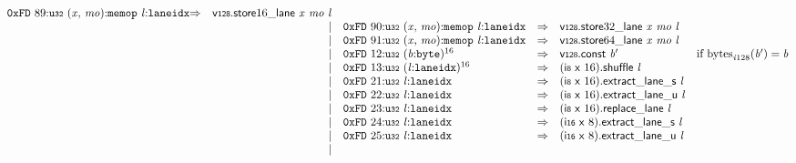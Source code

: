 $$\begin{array}{@{}l@{}rrlll@{}l@{}}
\mathtt{0xFD}~89{:}{\mathtt{u{\scriptstyle32}}}~({\mathit{x}},\, {\mathit{mo}}){:}{\mathtt{memop}}~{\mathit{l}}{:}{\mathtt{laneidx}} &\Rightarrow& {{{\mathsf{v{\scriptstyle128}.store}}{16}}{\mathsf{\_}}}{\mathsf{lane}}~{\mathit{x}}~{\mathit{mo}}~{\mathit{l}} \\ &&|&
\mathtt{0xFD}~90{:}{\mathtt{u{\scriptstyle32}}}~({\mathit{x}},\, {\mathit{mo}}){:}{\mathtt{memop}}~{\mathit{l}}{:}{\mathtt{laneidx}} &\Rightarrow& {{{\mathsf{v{\scriptstyle128}.store}}{32}}{\mathsf{\_}}}{\mathsf{lane}}~{\mathit{x}}~{\mathit{mo}}~{\mathit{l}} \\ &&|&
\mathtt{0xFD}~91{:}{\mathtt{u{\scriptstyle32}}}~({\mathit{x}},\, {\mathit{mo}}){:}{\mathtt{memop}}~{\mathit{l}}{:}{\mathtt{laneidx}} &\Rightarrow& {{{\mathsf{v{\scriptstyle128}.store}}{64}}{\mathsf{\_}}}{\mathsf{lane}}~{\mathit{x}}~{\mathit{mo}}~{\mathit{l}} \\ &&|&
\mathtt{0xFD}~12{:}{\mathtt{u{\scriptstyle32}}}~{({\mathit{b}}{:}{\mathtt{byte}})^{16}} &\Rightarrow& \mathsf{v{\scriptstyle128}}.\mathsf{const}~{\mathit{b}'} &\quad
  \mbox{if}~{{\mathrm{bytes}}}_{{{\mathit{i}}}{128}}({\mathit{b}'}) = {\mathit{b}} \\ &&|&
\mathtt{0xFD}~13{:}{\mathtt{u{\scriptstyle32}}}~{({\mathit{l}}{:}{\mathtt{laneidx}})^{16}} &\Rightarrow& (\mathsf{i{\scriptstyle8}}~\mathsf{x}~16).\mathsf{shuffle}~{\mathit{l}} \\ &&|&
\mathtt{0xFD}~21{:}{\mathtt{u{\scriptstyle32}}}~{\mathit{l}}{:}{\mathtt{laneidx}} &\Rightarrow& {(\mathsf{i{\scriptstyle8}}~\mathsf{x}~16).\mathsf{extract\_lane\_}}{\mathsf{s}}~{\mathit{l}} \\ &&|&
\mathtt{0xFD}~22{:}{\mathtt{u{\scriptstyle32}}}~{\mathit{l}}{:}{\mathtt{laneidx}} &\Rightarrow& {(\mathsf{i{\scriptstyle8}}~\mathsf{x}~16).\mathsf{extract\_lane\_}}{\mathsf{u}}~{\mathit{l}} \\ &&|&
\mathtt{0xFD}~23{:}{\mathtt{u{\scriptstyle32}}}~{\mathit{l}}{:}{\mathtt{laneidx}} &\Rightarrow& (\mathsf{i{\scriptstyle8}}~\mathsf{x}~16).\mathsf{replace\_lane}~{\mathit{l}} \\ &&|&
\mathtt{0xFD}~24{:}{\mathtt{u{\scriptstyle32}}}~{\mathit{l}}{:}{\mathtt{laneidx}} &\Rightarrow& {(\mathsf{i{\scriptstyle16}}~\mathsf{x}~8).\mathsf{extract\_lane\_}}{\mathsf{s}}~{\mathit{l}} \\ &&|&
\mathtt{0xFD}~25{:}{\mathtt{u{\scriptstyle32}}}~{\mathit{l}}{:}{\mathtt{laneidx}} &\Rightarrow& {(\mathsf{i{\scriptstyle16}}~\mathsf{x}~8).\mathsf{extract\_lane\_}}{\mathsf{u}}~{\mathit{l}} \\ &&|&

\end{array}$$
